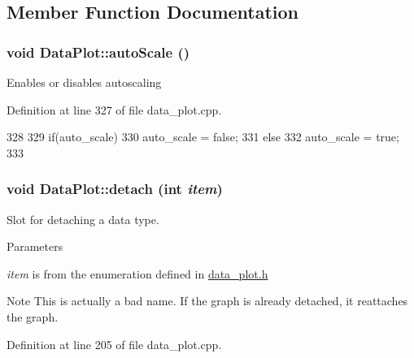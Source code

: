\subsection{Member Function Documentation}
\hypertarget{classDataPlot_a6409fa9685624b4a453529254e6d943f}{
\subsubsection[{autoScale}]{\setlength{\rightskip}{0pt plus 5cm}void DataPlot::autoScale ()}}
\label{classDataPlot_a6409fa9685624b4a453529254e6d943f}
Enables or disables autoscaling 

Definition at line 327 of file data\_\-plot.cpp.




\begin{DoxyCode}
328 {
329     if(auto_scale)
330         auto_scale = false;
331     else
332         auto_scale = true;
333 }
\end{DoxyCode}


\hypertarget{classDataPlot_a5521e1760646dbcf90df949e20523803}{
\subsubsection[{detach}]{\setlength{\rightskip}{0pt plus 5cm}void DataPlot::detach (int {\em item})}}
\label{classDataPlot_a5521e1760646dbcf90df949e20523803}
Slot for detaching a data type. 
\begin{DoxyParams}{Parameters}
\item[{\em item}]is from the enumeration defined in \hyperlink{data__plot_8h}{data\_\-plot.h} \end{DoxyParams}
\begin{DoxyNote}{Note}
This is actually a bad name. If the graph is already detached, it reattaches the graph. 
\end{DoxyNote}


Definition at line 205 of file data\_\-plot.cpp.




